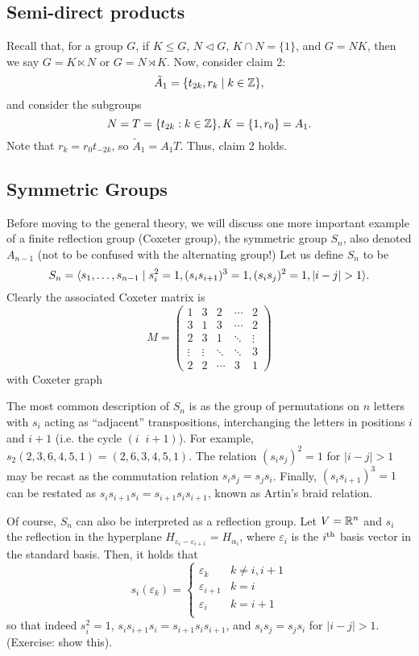 \subsection{Semi-direct products}

Recall that, for a group $G$, if $K \leq G$, $N \triangleleft G$,
$K \cap N = \{1\}$, and $G = NK$,
then we say $G = K \ltimes N$ or $G = N \rtimes K$.
Now, consider claim 2:
\[
    \tilde{A}_1 = \{t_{2k}, r_k \mid k \in \mathbb{Z}\},
\]
and consider the subgroups
\[
    N = T = \{t_{2k} : k \in \mathbb{Z}\}, K = \{1, r_0\} = A_1.
\]
Note that $r_k = r_0 t_{-2k}$, so $\tilde{A}_1 = A_1T$. Thus, claim 2 holds.

\subsection{Symmetric Groups}

Before moving to the general theory, we will discuss one more important example
of a finite reflection group (Coxeter group), the symmetric group $S_n$, also
denoted $A_{n-1}$ (not to be confused with the alternating group!)
Let us define $S_n$ to be
\[
    S_n = \langle s_1, \dots, s_{n-1} \mid s_i^2 = 1,
    (s_i s_{i+1})^3 = 1,
    (s_i s_j)^2 = 1, |i-j| > 1 \rangle.
\]
Clearly the associated Coxeter matrix is
\[
    M = \begin{pmatrix}
        1 & 3 & 2 & \cdots & 2 \\
        3 & 1 & 3 & \cdots & 2 \\
        2 & 3 & 1 & \ddots & \vdots \\
        \vdots & \vdots & \ddots & \ddots & 3 \\
        2 & 2 & \cdots & 3 & 1
    \end{pmatrix}
\]
with Coxeter graph

The most common description of $S_n$ is as the group of permutations on $n$
letters with $s_i$ acting as ``adjacent'' transpositions, interchanging the
letters in positions $i$ and $i+1$ (i.e. the cycle $(i \;\; i+1)$).
For example, $s_2(2,3,6,4,5,1) = (2,6,3,4,5,1)$.
The relation $(s_i s_j)^2 = 1$ for $|i-j|>1$ may be recast as the commutation
relation $s_i s_j = s_j s_i$. Finally, $(s_i s_{i+1})^3 = 1$ can be restated
as $s_i s_{i+1} s_i = s_{i+1} s_i s_{i+1}$, known as Artin's braid relation.

Of course, $S_n$ can also be interpreted as a reflection group. Let $V = \mathbb{R}^n$
and $s_i$ the reflection in the hyperplane $H_{\varepsilon_i - \varepsilon_{i+1}}
= H_{\alpha_i}$, where $\varepsilon_i$ is the $i^{\rm th}$ basis vector in the
standard basis. Then, it holds that
\[
    s_i(\varepsilon_k) = \begin{cases}
    \varepsilon_k & k \neq i, i+1 \\
    \varepsilon_{i+1} & k = i \\
    \varepsilon_{i} & k = i+1 \\
    \end{cases}
\]
so that indeed $s_i^2 = 1$, $s_i s_{i+1} s_i = s_{i+1} s_i s_{i+1}$, and
$s_i s_j = s_j s_i$ for $|i-j|>1$. (Exercise: show this).

